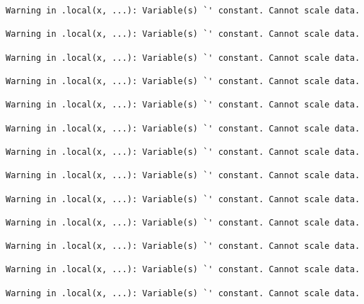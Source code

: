 \documentclass[
  letterpaper,
  DIV=11,
  numbers=noendperiod]{scrartcl}
\newenvironment{Shaded}{\begin{snugshade}}{\end{snugshade}}
\newcommand{\AttributeTok}[1]{\textcolor[rgb]{0.40,0.45,0.13}{#1}}
\newcommand{\DecValTok}[1]{\textcolor[rgb]{0.68,0.00,0.00}{#1}}
\newcommand{\FunctionTok}[1]{\textcolor[rgb]{0.28,0.35,0.67}{#1}}
\newcommand{\NormalTok}[1]{\textcolor[rgb]{0.00,0.23,0.31}{#1}}
\newcommand{\OtherTok}[1]{\textcolor[rgb]{0.00,0.23,0.31}{#1}}
\newcommand{\SpecialCharTok}[1]{\textcolor[rgb]{0.37,0.37,0.37}{#1}}
\newcommand{\StringTok}[1]{\textcolor[rgb]{0.13,0.47,0.30}{#1}}
\begin{document}
\begin{verbatim}
Warning in .local(x, ...): Variable(s) `' constant. Cannot scale data.

Warning in .local(x, ...): Variable(s) `' constant. Cannot scale data.

Warning in .local(x, ...): Variable(s) `' constant. Cannot scale data.

Warning in .local(x, ...): Variable(s) `' constant. Cannot scale data.

Warning in .local(x, ...): Variable(s) `' constant. Cannot scale data.

Warning in .local(x, ...): Variable(s) `' constant. Cannot scale data.

Warning in .local(x, ...): Variable(s) `' constant. Cannot scale data.

Warning in .local(x, ...): Variable(s) `' constant. Cannot scale data.

Warning in .local(x, ...): Variable(s) `' constant. Cannot scale data.

Warning in .local(x, ...): Variable(s) `' constant. Cannot scale data.

Warning in .local(x, ...): Variable(s) `' constant. Cannot scale data.

Warning in .local(x, ...): Variable(s) `' constant. Cannot scale data.

Warning in .local(x, ...): Variable(s) `' constant. Cannot scale data.
\end{verbatim}

\begin{Shaded}
\end{Shaded}
\end{document}
